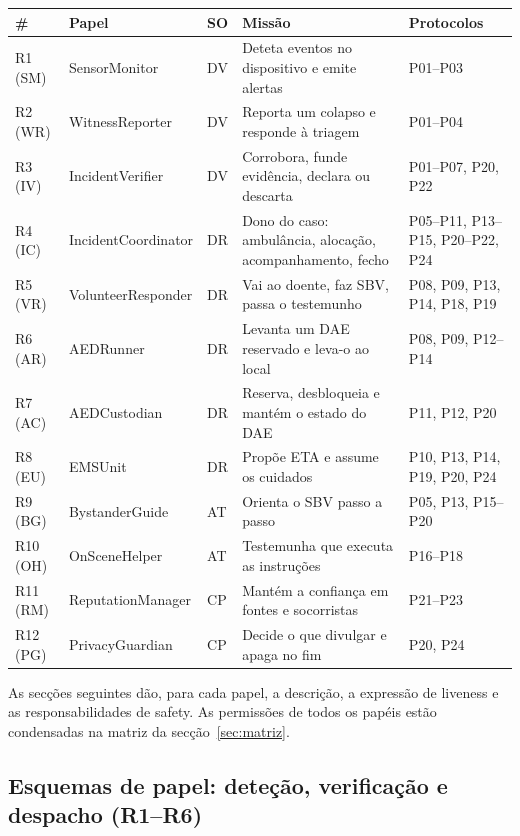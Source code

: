 \documentclass[10pt,a4paper]{article}
\begin{document}
\begin{xltabular}{\linewidth}{@{}l>{\ttfamily}llLP{3.1cm}@{}}
\toprule
\# & \normalfont Papel & SO & Missão & Protocolos \\
\midrule
\endhead
R1 (SM) & SensorMonitor & DV & Deteta eventos no dispositivo e emite alertas & P01--P03 \\
R2 (WR) & WitnessReporter & DV & Reporta um colapso e responde à triagem & P01--P04 \\
R3 (IV) & IncidentVerifier & DV & Corrobora, funde evidência, declara ou descarta & P01--P07, P20, P22 \\
R4 (IC) & IncidentCoordinator & DR & Dono do caso: ambulância, alocação, acompanhamento, fecho & P05--P11, P13--P15, P20--P22, P24 \\
R5 (VR) & VolunteerResponder & DR & Vai ao doente, faz SBV, passa o testemunho & P08, P09, P13, P14, P18, P19 \\
R6 (AR) & AEDRunner & DR & Levanta um DAE reservado e leva-o ao local & P08, P09, P12--P14 \\
R7 (AC) & AEDCustodian & DR & Reserva, desbloqueia e mantém o estado do DAE & P11, P12, P20 \\
R8 (EU) & EMSUnit & DR & Propõe ETA e assume os cuidados & P10, P13, P14, P19, P20, P24 \\
R9 (BG) & BystanderGuide & AT & Orienta o SBV passo a passo & P05, P13, P15--P20 \\
R10 (OH) & OnSceneHelper & AT & Testemunha que executa as instruções & P16--P18 \\
R11 (RM) & ReputationManager & CP & Mantém a confiança em fontes e socorristas & P21--P23 \\
R12 (PG) & PrivacyGuardian & CP & Decide o que divulgar e apaga no fim & P20, P24 \\
\bottomrule
\end{xltabular}

As secções seguintes dão, para cada papel, a descrição, a expressão de liveness e as responsabilidades de safety. As permissões de todos os papéis estão condensadas na matriz da secção~\ref{sec:matriz}.

\subsection{Esquemas de papel: deteção, verificação e despacho (R1--R6)}\label{sec:esquemas1}
\end{document}

